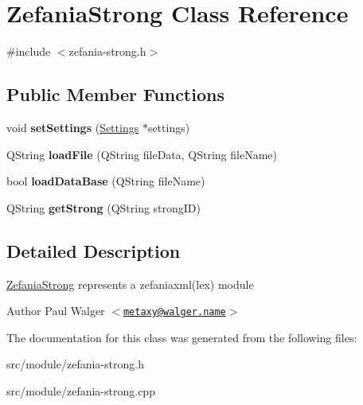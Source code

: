 \hypertarget{classZefaniaStrong}{
\section{ZefaniaStrong Class Reference}
\label{classZefaniaStrong}
}


{\ttfamily \#include $<$zefania-\/strong.h$>$}

\subsection*{Public Member Functions}
\begin{DoxyCompactItemize}
\item 
\hypertarget{classZefaniaStrong_a393ceabf1e0ec34def99a79a941e042d}{
void {\bfseries setSettings} (\hyperlink{classSettings}{Settings} $\ast$settings)}
\label{classZefaniaStrong_a393ceabf1e0ec34def99a79a941e042d}

\item 
\hypertarget{classZefaniaStrong_aff50283c4e68f6d6760609b0d42a8c2c}{
QString {\bfseries loadFile} (QString fileData, QString fileName)}
\label{classZefaniaStrong_aff50283c4e68f6d6760609b0d42a8c2c}

\item 
\hypertarget{classZefaniaStrong_aed2e5d60535ea142164ac03f0f2309c4}{
bool {\bfseries loadDataBase} (QString fileName)}
\label{classZefaniaStrong_aed2e5d60535ea142164ac03f0f2309c4}

\item 
\hypertarget{classZefaniaStrong_a30c0077f7320e33e50890dce8c72af99}{
QString {\bfseries getStrong} (QString strongID)}
\label{classZefaniaStrong_a30c0077f7320e33e50890dce8c72af99}

\end{DoxyCompactItemize}


\subsection{Detailed Description}
\hyperlink{classZefaniaStrong}{ZefaniaStrong} represents a zefaniaxml(lex) module

\begin{DoxyAuthor}{Author}
Paul Walger $<$\href{mailto:metaxy@walger.name}{\tt metaxy@walger.name}$>$ 
\end{DoxyAuthor}


The documentation for this class was generated from the following files:\begin{DoxyCompactItemize}
\item 
src/module/zefania-\/strong.h\item 
src/module/zefania-\/strong.cpp\end{DoxyCompactItemize}
